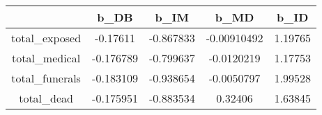 \begin{tabular}{|c|c|c|c|c|}
\hline
& b_DB & b_IM & b_MD & b_ID \\
\hline
total_exposed & -0.17611 & -0.867833 & -0.00910492 & 1.19765 \\
\hline
total_medical & -0.176789 & -0.799637 & -0.0120219 & 1.17753 \\
\hline
total_funerals & -0.183109 & -0.938654 & -0.0050797 & 1.99528 \\
\hline
total_dead & -0.175951 & -0.883534 & 0.32406 & 1.63845 \\
\hline
\end{tabular}
